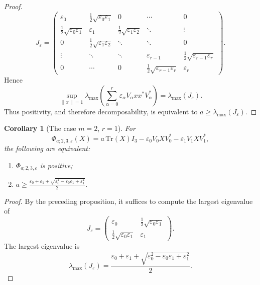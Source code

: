 \documentclass[12pt,a4paper]{amsart}
\theoremstyle{plain}
\newtheorem{corollary}[theorem]{Corollary}
\theoremstyle{remark}
\theoremstyle{definition}
\newcommand{\Tr}{{\textrm{Tr}}}
\begin{document}
\begin{proof}
	\[
	J_\varepsilon=
	\begin{pmatrix}
		\varepsilon_0 & \frac12\sqrt{\varepsilon_0\varepsilon_1} & 0 & \cdots & 0\\
		\frac12\sqrt{\varepsilon_0\varepsilon_1} & \varepsilon_1 &
		\frac12\sqrt{\varepsilon_1\varepsilon_2} & \ddots & \vdots\\
		0 & \frac12\sqrt{\varepsilon_1\varepsilon_2} & \ddots & \ddots & 0\\
		\vdots & \ddots & \ddots & \varepsilon_{r-1} &
		\frac12\sqrt{\varepsilon_{r-1}\varepsilon_r}\\
		0 & \cdots & 0 & \frac12\sqrt{\varepsilon_{r-1}\varepsilon_r} & \varepsilon_r
	\end{pmatrix}.
	\]
	Hence
	\[
	\sup_{\|x\|=1}
	\lambda_{\max}\!\left(\sum_{\alpha=0}^{r}\varepsilon_\alpha V_\alpha xx^*V_\alpha^*\right)
	=
	\lambda_{\max}(J_\varepsilon).
	\]
	Thus positivity, and therefore decomposability, is equivalent to $
	a\ge \lambda_{\max}(J_\varepsilon). $
\end{proof}

\begin{corollary}[The case $m=2$, $r=1$]\rm 
	For
	\[
	\Phi_{a;2,3,\varepsilon}(X)
	=
	a\,\Tr(X)I_3-\varepsilon_0V_0XV_0^*-\varepsilon_1V_1XV_1^*,
	\]
	the following are equivalent:
	\begin{enumerate}
		\item $\Phi_{a;2,3,\varepsilon}$ is positive;
		\item
		$\displaystyle
		a\ge
		\frac{\varepsilon_0+\varepsilon_1+\sqrt{\varepsilon_0^2-\varepsilon_0\varepsilon_1+\varepsilon_1^2}}{2}.
		$
	\end{enumerate}
\end{corollary}

\begin{proof}
	By the preceding proposition, it suffices to compute the largest eigenvalue of
	\[
	J_\varepsilon=
	\begin{pmatrix}
		\varepsilon_0 & \frac12\sqrt{\varepsilon_0\varepsilon_1}\\[1mm]
		\frac12\sqrt{\varepsilon_0\varepsilon_1} & \varepsilon_1
	\end{pmatrix}.
	\]
The largest eigenvalue is
	\[
	\lambda_{\max}(J_\varepsilon)
	=
	\frac{\varepsilon_0+\varepsilon_1+\sqrt{\varepsilon_0^2-\varepsilon_0\varepsilon_1+\varepsilon_1^2}}{2}.
	\]
\end{proof}
\end{document}
